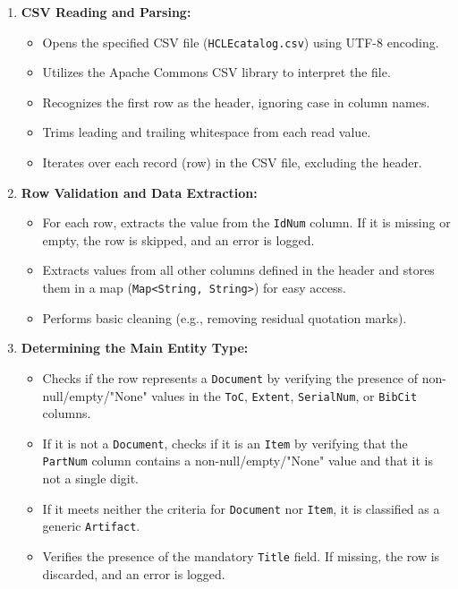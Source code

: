\documentclass[11pt, a4paper]{article}
\begin{document}
\begin{enumerate}
    \item \textbf{CSV Reading and Parsing:}
        \begin{itemize}
            \item Opens the specified CSV file (\texttt{HCLEcatalog.csv}) using UTF-8 encoding.
            \item Utilizes the Apache Commons CSV library to interpret the file.
            \item Recognizes the first row as the header, ignoring case in column names.
            \item Trims leading and trailing whitespace from each read value.
            \item Iterates over each record (row) in the CSV file, excluding the header.
        \end{itemize}

    \item \textbf{Row Validation and Data Extraction:}
        \begin{itemize}
            \item For each row, extracts the value from the \texttt{IdNum} column. If it is missing or empty, the row is skipped, and an error is logged.
            \item Extracts values from all other columns defined in the header and stores them in a map (\texttt{Map<String, String>}) for easy access.
            \item Performs basic cleaning (e.g., removing residual quotation marks).
        \end{itemize}

    \item \textbf{Determining the Main Entity Type:}
        \begin{itemize}
            \item Checks if the row represents a \texttt{Document} by verifying the presence of non-null/empty/"None" values in the \texttt{ToC}, \texttt{Extent}, \texttt{SerialNum}, or \texttt{BibCit} columns.
            \item If it is not a \texttt{Document}, checks if it is an \texttt{Item} by verifying that the \texttt{PartNum} column contains a non-null/empty/"None" value and that it is not a single digit.
            \item If it meets neither the criteria for \texttt{Document} nor \texttt{Item}, it is classified as a generic \texttt{Artifact}.
            \item Verifies the presence of the mandatory \texttt{Title} field. If missing, the row is discarded, and an error is logged.
        \end{itemize}


\end{enumerate}
\end{document}
